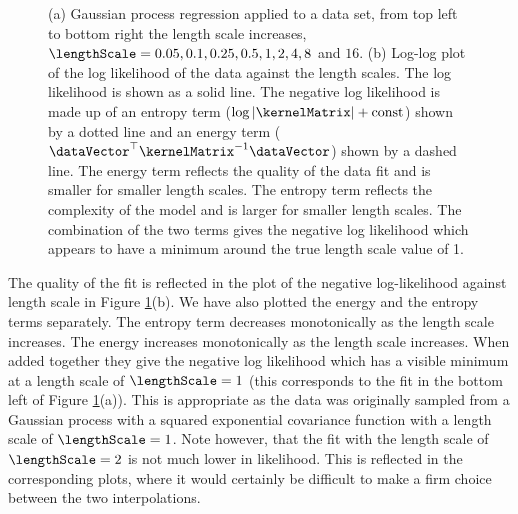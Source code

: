 \begin{figure}[htb]
\hfill
\begin{minipage}[b][0.38\textwidth]{0.38\textwidth}
\end{minipage}
\caption{(a) Gaussian process regression applied to a data set, from
  top left to bottom right the length scale increases, $\lengthScale =
  0.05, 0.1, 0.25, 0.5, 1, 2, 4, 8$ and $16$. (b) Log-log plot of the
  log likelihood of the data against the length scales. The log
  likelihood is shown as a solid line. The negative log likelihood is
  made up of an entropy term ($\log \left\vert\kernelMatrix\right\vert +
  \mathrm{const}$) shown by a dotted line and an energy term
  ($\dataVector^\top\kernelMatrix^{-1}\dataVector$) shown by a dashed
  line. The energy term reflects the quality of the data fit and is
  smaller for smaller length scales. The entropy term reflects the
  complexity of the model and is larger for smaller length scales. The
  combination of the two terms gives the negative log likelihood which
  appears to have a minimum around the true length scale value of 1.}
\label{fig:dataFitting}
\end{figure}

The quality of the fit is reflected in the plot of the negative
log-likelihood against length scale in Figure
\ref{fig:dataFitting}(b). We have also plotted the energy and the
entropy terms separately. The entropy term decreases monotonically as
the length scale increases. The energy increases monotonically as the
length scale increases. When added together they give the negative log
likelihood which has a visible minimum at a length scale of
$\lengthScale=1$ (this corresponds to the fit in the bottom left of
Figure \ref{fig:dataFitting}(a)). This is appropriate as the data was
originally sampled from a Gaussian process with a squared exponential
covariance function with a length scale of $\lengthScale=1$. Note
however, that the fit with the length scale of $\lengthScale=2$ is not
much lower in likelihood. This is reflected in the corresponding
plots, where it would certainly be difficult to make a firm choice
between the two interpolations.


